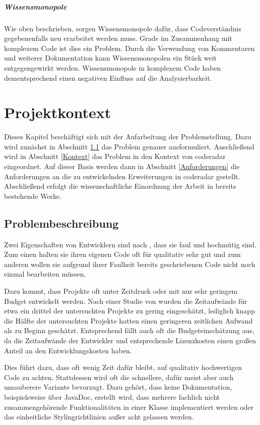 \documentclass[
	oneside,  %
	ngerman, 
	final, 
	11pt, 
	a4paper, 
	1.1headlines, 
	headinclude=false, 
	footinclude=false, 
	mpinclude=false, 
	pagesize, 
	onecolumn, 
	titlepage, 
	parskip=half, 
	headsepline, 
	chapterprefix=false, 
	version=first, 
	listof=totoc, 
	bibliography=totoc, 
	toc=graduated, 
	fleqn
]{scrbook}
\begin{document}
\paragraph{Wissensmonopole}
Wie oben beschrieben, sorgen Wissensmonopole dafür, dass Codeverständnis gegebenenfalls neu erarbeitet werden muss.
Grade im Zusammenhang mit komplexem Code ist dies ein Problem.
Durch die Verwendung von Kommentaren und weiterer Dokumentation kann Wissensmonopolen ein Stück weit entgegengewirkt werden.
Wissensmonopole in komplexem Code haben dementsprechend einen negativen Einfluss auf die Analysierbarkeit.

\chapter{Projektkontext}
\label{Projektkontext}
Dieses Kapitel beschäftigt sich mit der Aufarbeitung der Problemstellung.
Dazu wird zunächst in Abschnitt \ref{Problembeschreibung} das Problem genauer ausformuliert.
Anschließend wird in Abschnitt \ref{Kontext} das Problem in den Kontext von coderadar eingeordnet.
Auf dieser Basis werden dann in Abschnitt \ref{Anforderungen} die Anforderungen an die zu entwickelnden Erweiterungen in coderadar gestellt.
Abschließend erfolgt die wissenschaftliche Einordnung der Arbeit in bereits bestehende Werke.

\section{Problembeschreibung}
\label{Problembeschreibung}
Zwei Eigenschaften von Entwicklern sind nach \cite{WCSP1996}, dass sie faul und hochmütig sind.
Zum einen halten sie ihren eigenen Code oft für qualitativ sehr gut und zum anderen wollen sie aufgrund ihrer Faulheit bereits geschriebenen Code nicht noch einmal bearbeiten müssen.

Dazu kommt, dass Projekte oft unter Zeitdruck oder mit nur sehr geringem Budget entwickelt werden.
Nach einer Studie von \cite{KPME2002} wurden die Zeitaufwände für etwa ein drittel der untersuchten Projekte zu gering eingeschätzt, lediglich knapp die Hälfte der untersuchten Projekte hatten einen geringeren zeitlichen Aufwand als zu Beginn geschätzt.
Entsprechend fällt auch oft die Budgeteinschätzung aus, da die Zeitaufwände der Entwickler und entsprechende Lizenzkosten einen großen Anteil an den Entwicklungskosten haben.

Dies führt dazu, dass oft wenig Zeit dafür bleibt, auf qualitativ hochwertigen Code zu achten.
Stattdessen wird oft die schnellere, dafür meist aber auch unsauberere Variante bevorzugt.
Dazu gehört, dass keine Dokumentation, beispielsweise über JavaDoc, erstellt wird, dass mehrere fachlich nicht zusammengehörende Funktionalitäten in einer Klasse implementiert werden oder das einheitliche Stylingrichtlinien außer acht gelassen werden. 
\end{document}
